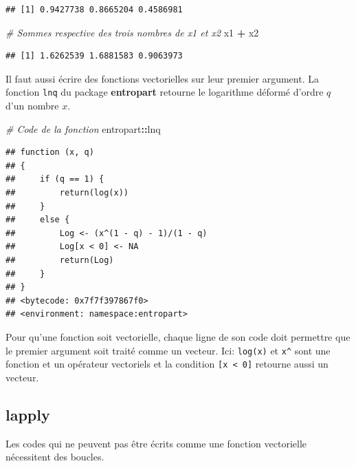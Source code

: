 \documentclass[
  12pt,
  french,
  a4paper,
  extrafontsizes,onecolumn,openright
  ]{memoir}
\newenvironment{Shaded}{\begin{snugshade}}{\end{snugshade}}
\newcommand{\CommentTok}[1]{\textcolor[rgb]{0.56,0.35,0.01}{\textit{#1}}}
\newcommand{\NormalTok}[1]{#1}
\newcommand{\OperatorTok}[1]{\textcolor[rgb]{0.81,0.36,0.00}{\textbf{#1}}}
\newcommand{\StringTok}[1]{\textcolor[rgb]{0.31,0.60,0.02}{#1}}
\begin{document}
\begin{verbatim}
## [1] 0.9427738 0.8665204 0.4586981
\end{verbatim}

\begin{Shaded}
\begin{Highlighting}[]
\CommentTok{# Sommes respective des trois nombres de x1 et x2}
\NormalTok{x1 }\OperatorTok{+}\StringTok{ }\NormalTok{x2}
\end{Highlighting}
\end{Shaded}

\begin{verbatim}
## [1] 1.6262539 1.6881583 0.9063973
\end{verbatim}

\normalsize

Il faut aussi écrire des fonctions vectorielles sur leur premier argument.
La fonction \texttt{lnq} du package \textbf{entropart} retourne le logarithme déformé d'ordre \(q\) d'un nombre \(x\).

\scriptsize

\begin{Shaded}
\begin{Highlighting}[]
\CommentTok{# Code de la fonction}
\NormalTok{entropart}\OperatorTok{::}\NormalTok{lnq}
\end{Highlighting}
\end{Shaded}

\begin{verbatim}
## function (x, q) 
## {
##     if (q == 1) {
##         return(log(x))
##     }
##     else {
##         Log <- (x^(1 - q) - 1)/(1 - q)
##         Log[x < 0] <- NA
##         return(Log)
##     }
## }
## <bytecode: 0x7f7f397867f0>
## <environment: namespace:entropart>
\end{verbatim}

\normalsize

Pour qu'une fonction soit vectorielle, chaque ligne de son code doit permettre que le premier argument soit traité comme un vecteur.
Ici: \texttt{log(x)} et \texttt{x\^{}} sont une fonction et un opérateur vectoriels et la condition \texttt{{[}x\ \textless{}\ 0{]}} retourne aussi un vecteur.

\hypertarget{lapply}{%
\subsection{lapply}\label{lapply}}

Les codes qui ne peuvent pas être écrits comme une fonction vectorielle nécessitent des boucles.
\end{document}
